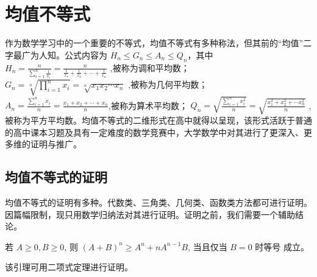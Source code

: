 \chapter{均值不等式}

作为数学学习中的一个重要的不等式，均值不等式有多种称法，但其前的“均值”二字最广为人知。公式内容为 $H_{n} \leq G_{n} \leq A_{n} \leq Q_{n}$，其中 $H_{n} = \frac{n}{\sum_{i = 1}^{n} \frac{1}{x_{i}}} = \frac{n}{\frac{1}{x_{1}} + \frac{1}{x_{2}} + \cdots + \frac{1}{x_{n}}}$ ,被称为调和平均数； $G_{n} = \sqrt[n]{\prod_{i = 1}^{n} x_{i}} = \sqrt[n]{x_{1} x_{2} \cdots x_{n}}$ ,被称为几何平均数； $A_{n} = \frac{\sum_{i = 1}^{n} x_{i}}{n}=  \frac{x_{1}+ x_{2} + \cdots + x_{n}}{n}$,被称为算术平均数； $Q_{n} = \sqrt{\frac{\sum_{i = 1}^{n} x_{i}^{2}}{n}} = \sqrt{\frac{x_{1}^{2} + x_{2}^{2} + \cdots x_{n}^{2}}{n}}$ ,被称为平方平均数。均值不等式的二维形式在高中就得以呈现，该形式活跃于普通的高中课本习题及具有一定难度的数学竞赛中，大学数学中对其进行了更深入、更多维的证明与推广。



\section{均值不等式的证明}

均值不等式的证明有多种。代数类、三角类、几何类、函数类方法都可进行证明\parencite{贾静2017关于均值不等式的教学探究及应用}。因篇幅限制，现只用数学归纳法对其进行证明。证明之前，我们需要一个辅助结论。

\begin{lemma}\label{lemma:均值不等式引理}
  若 $A \geq 0, B \geq 0$, 则 $(A+B)^{n} \geq A^{n}+n A^{n-1} B$, 当且仅当 $B=0$ 时等号 成立。
\end{lemma}

该引理可用二项式定理进行证明。

